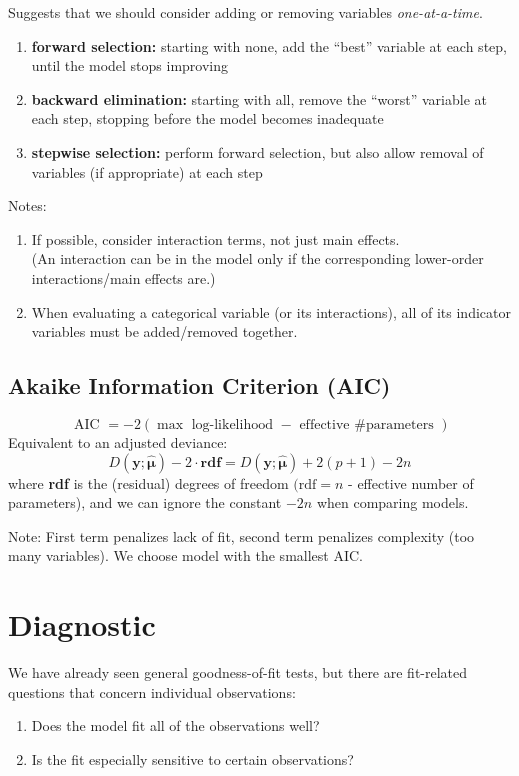 \documentclass[11pt]{elegantbook}
\begin{document}
Suggests that we should consider adding or removing variables \textit{one-at-a-time}.

\begin{definition}
\normalfont
\begin{enumerate}[$\bullet$]
    \item \textbf{forward selection:} starting with none, add the “best” variable at each step, until the model stops improving
    \item \textbf{backward elimination:} starting with all, remove the “worst” variable at each step, stopping before the model becomes inadequate
    \item \textbf{stepwise selection:} perform forward selection, but also allow removal of variables (if appropriate) at each step
\end{enumerate}
\end{definition}
Notes:
\begin{enumerate}[$\bullet$]
    \item If possible, consider interaction terms, not just main effects.\\
    (An interaction can be in the model only if the corresponding lower-order interactions/main effects are.)
    \item When evaluating a categorical variable (or its interactions), all of its indicator variables must be added/removed together.
\end{enumerate}

\subsection{Akaike Information Criterion (AIC)}
\begin{definition}
\normalfont
$$
\text { AIC }=-2(\max \text { log-likelihood }- \text { effective \# parameters })
$$
Equivalent to an adjusted deviance:
$$
D(\boldsymbol{y} ; \hat{\boldsymbol{\mu}})-2 \cdot \mathbf{r d f}=D(\boldsymbol{y} ; \hat{\boldsymbol{\mu}})+2(p+1)-2 n
$$
where \textbf{rdf} is the (residual) degrees of freedom $(\mathrm{rdf}=n$ - effective number of parameters), and we can ignore the constant $-2 n$ when comparing models.
\end{definition}
Note: First term penalizes lack of fit, second term penalizes complexity (too many variables). We choose model with the smallest AIC.

\section{Diagnostic}
We have already seen general goodness-of-fit tests, but there are fit-related questions that concern individual observations:
\begin{enumerate}
    \item Does the model fit all of the observations well?
    \item Is the fit especially sensitive to certain observations?
\end{enumerate}
\end{document}
